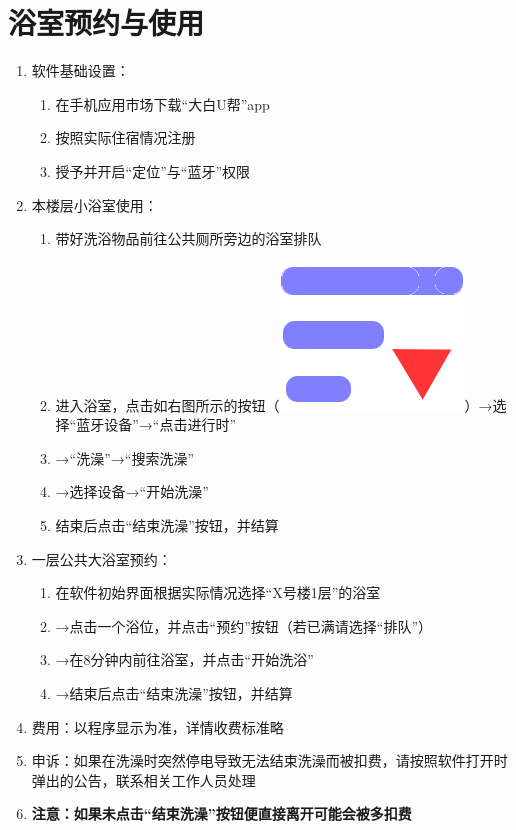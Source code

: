 \section[浴室预约与使用]{浴室预约与使用}
\label{wash_software}
\begin{enumerate}
    \item 软件基础设置：
          \begin{enumerate}
              \item 在手机应用市场下载“大白U帮”app
              \item 按照实际住宿情况注册
              \item 授予并开启“定位”与“蓝牙”权限
          \end{enumerate}
    \item 本楼层小浴室使用：
          \begin{enumerate}
              \item 带好洗浴物品前往公共厕所旁边的浴室排队
              \item 进入浴室，点击如右图所示的按钮（\mbox{\includegraphics[height=2.4ex]{bath.png}}）→选择“蓝牙设备”→“点击进行时”
              \item →“洗澡”→“搜索洗澡”\footnotemark
              \item →选择设备\footnotemark →“开始洗澡”
              \item 结束后点击“结束洗澡”按钮，并结算
          \end{enumerate}
    \item 一层公共大浴室预约：
          \begin{enumerate}
              \item 在软件初始界面根据实际情况选择“X号楼1层”的浴室
              \item →点击一个浴位，并点击“预约”按钮（若已满请选择“排队”）
              \item →在8分钟内前往浴室，并点击“开始洗浴”
              \item →结束后点击“结束洗澡”按钮，并结算
          \end{enumerate}
    \item 费用：以程序显示为准，详情收费标准略
    \item 申诉：如果在洗澡时突然停电导致无法结束洗澡而被扣费，请按照软件打开时弹出的公告，联系相关工作人员处理
    \item \textbf{注意：如果未点击“结束洗澡”按钮便直接离开可能会被多扣费}
\end{enumerate}

